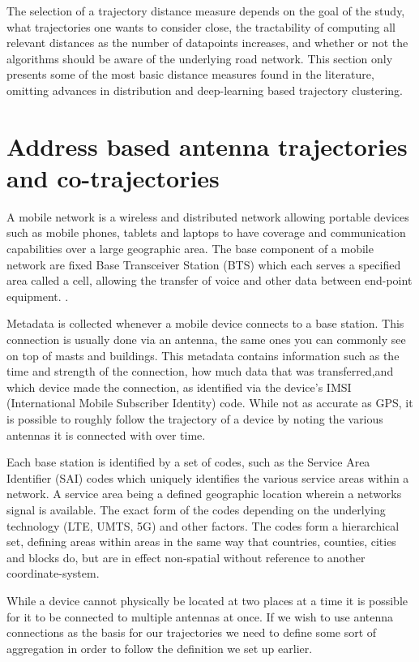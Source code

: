 \documentclass[../main.tex]{subfiles}
\begin{document}
The selection of a trajectory distance measure depends on the goal of the study, what trajectories one wants to consider close, the tractability of computing all relevant distances as the number of datapoints increases, and whether or not the algorithms should be aware of the underlying road network. This section only presents some of the most basic distance measures found in the literature, omitting advances in distribution and deep-learning based trajectory clustering.

\section{Address based antenna trajectories and co-trajectories}

A mobile network is a wireless and distributed network
allowing portable devices such as mobile phones, tablets and laptops 
to have coverage and communication capabilities over a large geographic
area. The base component of a mobile network are fixed Base Transceiver 
Station (BTS) which each serves a specified area called a cell, allowing the 
transfer of voice and other data between end-point equipment. \cite{miao2016fundamentals}.

Metadata is collected whenever a mobile device connects to a base station. This connection is usually done via an antenna, the same ones you can commonly see on top of masts and buildings. This metadata contains information such
as the time and strength of the connection, how much data that was transferred,and which device made the connection, as identified via the device's IMSI (International Mobile Subscriber Identity) code. While not as accurate as GPS, it is possible to roughly follow the trajectory of a device by noting the various antennas it is connected with over time.

Each base station is identified by a set of codes, such as the Service Area Identifier (SAI) codes which uniquely identifies the various service areas within a network. A service area being a defined geographic location wherein a networks signal is available. The exact form of the codes depending on the underlying technology (LTE, UMTS, 5G) and other factors. The codes form a hierarchical set, defining areas within areas in the same way that countries, counties, cities and blocks do, but are in effect non-spatial without reference to another coordinate-system.

While a device cannot physically be located at two places at a time it is possible for it to be connected to multiple antennas at once.
If we wish to use antenna connections as the basis for our trajectories we need to define some sort of aggregation in order to follow the definition we set up earlier.
\end{document}
